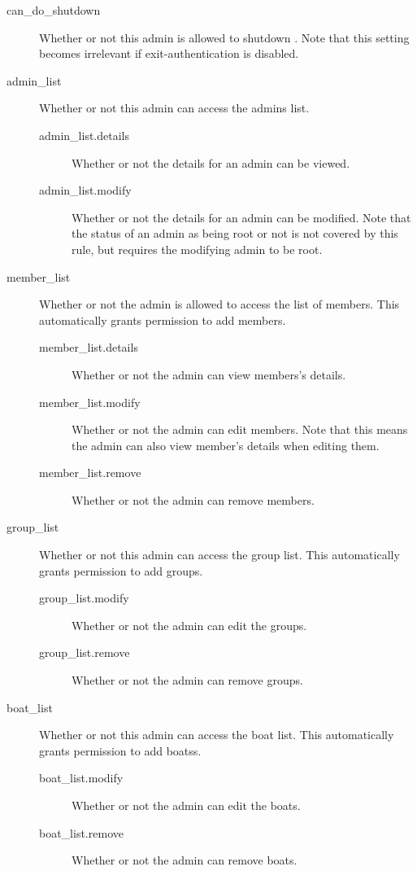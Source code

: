     \begin{description}
        \item [can\_do\_shutdown] Whether or not this admin is allowed to shutdown \srl. Note that this setting becomes irrelevant if exit-authentication is disabled.
        
        \item [admin\_list] Whether or not this admin can access the admins list.
        \begin{description}
            \item [admin\_list.details] Whether or not the details for an admin
                    can be viewed.
            \item [admin\_list.modify] Whether or not the details for an admin
                    can be modified. Note that the status of an admin as being
                    root or not is not covered by this rule, but requires the
                    modifying admin to be root.
        \end{description}
        
        \item [member\_list] Whether or not the admin is allowed to access the list of members. This automatically grants permission to add members.
        \begin{description}
            \item [member\_list.details] Whether or not the admin can view members's details.
            \item [member\_list.modify] Whether or not the admin can edit members. Note that this means the admin can also view member's details when editing them.
            \item [member\_list.remove] Whether or not the admin can remove members.
        \end{description}
        
        \item [group\_list] Whether or not this admin can access the group list. This automatically grants permission to add groups.
        \begin{description}
            \item [group\_list.modify] Whether or not the admin can edit the groups.
            \item [group\_list.remove] Whether or not the admin can remove groups.
        \end{description}
        
        \item [boat\_list] Whether or not this admin can access the boat list. This automatically grants permission to add boatss.
        \begin{description}
            \item [boat\_list.modify] Whether or not the admin can edit the boats.
            \item [boat\_list.remove] Whether or not the admin can remove boats.
        \end{description}
    \end{description}